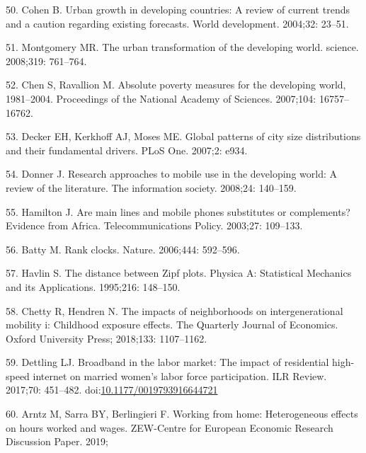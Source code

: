 \documentclass[10pt,letterpaper]{article}
\begin{document}
\leavevmode\hypertarget{ref-cohen_urban_2004}{}%
50. Cohen B. Urban growth in developing countries: A review of current
trends and a caution regarding existing forecasts. World development.
2004;32: 23--51.

\leavevmode\hypertarget{ref-montgomery_urban_2008}{}%
51. Montgomery MR. The urban transformation of the developing world.
science. 2008;319: 761--764.

\leavevmode\hypertarget{ref-chen_absolute_2007}{}%
52. Chen S, Ravallion M. Absolute poverty measures for the developing
world, 1981--2004. Proceedings of the National Academy of Sciences.
2007;104: 16757--16762.

\leavevmode\hypertarget{ref-decker_global_2007}{}%
53. Decker EH, Kerkhoff AJ, Moses ME. Global patterns of city size
distributions and their fundamental drivers. PLoS One. 2007;2: e934.

\leavevmode\hypertarget{ref-donner_research_2008}{}%
54. Donner J. Research approaches to mobile use in the developing world:
A review of the literature. The information society. 2008;24: 140--159.

\leavevmode\hypertarget{ref-hamilton_are_2003}{}%
55. Hamilton J. Are main lines and mobile phones substitutes or
complements? Evidence from Africa. Telecommunications Policy. 2003;27:
109--133.

\leavevmode\hypertarget{ref-batty_rank_2006}{}%
56. Batty M. Rank clocks. Nature. 2006;444: 592--596.

\leavevmode\hypertarget{ref-havlin_distance_1995}{}%
57. Havlin S. The distance between Zipf plots. Physica A: Statistical
Mechanics and its Applications. 1995;216: 148--150.

\leavevmode\hypertarget{ref-chetty2018impacts}{}%
58. Chetty R, Hendren N. The impacts of neighborhoods on
intergenerational mobility i: Childhood exposure effects. The Quarterly
Journal of Economics. Oxford University Press; 2018;133: 1107--1162.

\leavevmode\hypertarget{ref-dettling2017}{}%
59. Dettling LJ. Broadband in the labor market: The impact of
residential high-speed internet on married women's labor force
participation. ILR Review. 2017;70: 451--482.
doi:\href{https://doi.org/10.1177/0019793916644721}{10.1177/0019793916644721}

\leavevmode\hypertarget{ref-arntz2019working}{}%
60. Arntz M, Sarra BY, Berlingieri F. Working from home: Heterogeneous
effects on hours worked and wages. ZEW-Centre for European Economic
Research Discussion Paper. 2019;
\end{document}
